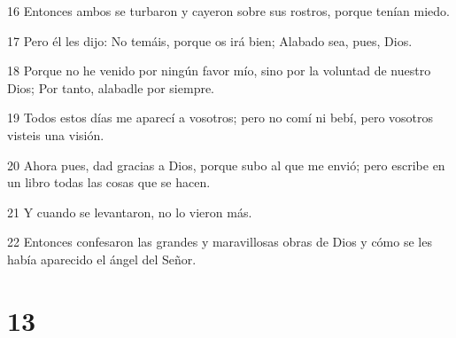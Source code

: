 \par 16 Entonces ambos se turbaron y cayeron sobre sus rostros, porque tenían miedo.
\par 17 Pero él les dijo: No temáis, porque os irá bien; Alabado sea, pues, Dios.
\par 18 Porque no he venido por ningún favor mío, sino por la voluntad de nuestro Dios; Por tanto, alabadle por siempre.
\par 19 Todos estos días me aparecí a vosotros; pero no comí ni bebí, pero vosotros visteis una visión.
\par 20 Ahora pues, dad gracias a Dios, porque subo al que me envió; pero escribe en un libro todas las cosas que se hacen.
\par 21 Y cuando se levantaron, no lo vieron más.
\par 22 Entonces confesaron las grandes y maravillosas obras de Dios y cómo se les había aparecido el ángel del Señor.

\chapter{13}

